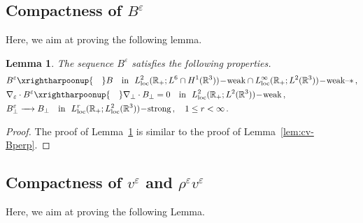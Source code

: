 \documentclass[11pt,reqno]{amsart}
\newtheorem{lemma}{Lemma}
\def \R{{\mathbb{R}}}
\begin{document}

\subsection{Compactness of $B^\varepsilon $ }
Here, we aim at proving the following lemma.
\begin{lemma}
  \label{lem:cv-Bperp-R}
  The sequence ${B^\varepsilon}$ satisfies the following properties.
  \begin{align*}
    & B^\varepsilon \xrightharpoonup{\quad} B \ \ \mbox{ \rm in } \  L_{\rm loc}^2(\R_+;L^6\cap H^1(\R^3))\!-\!\mbox{\rm weak} \cap  L_{\rm loc}^\infty(\R_+ ;L^2(\R^3))\!-\!\mbox{\rm weak--}\ast\,,\\
    & \nabla_\varepsilon \cdot B^\varepsilon   \xrightharpoonup{\quad}\nabla_\perp \cdot B_\perp =0 \ \ \mbox{ \rm in } \  L_{\rm loc}^2(\R_+; L^2(\R^3))\!-\!\mbox{\rm weak}\,,\\
    &  B_\perp^\varepsilon \xrightarrow{\quad} B_\perp \ \ \mbox{ \rm in } \  L_{\rm loc}^r(\R_+; L_{\rm loc}^2(\R^3))\!-\!\mbox{\rm strong}\,, \quad 1\leq r <\infty\,. 
  \end{align*}
\end{lemma}

\begin{proof}
The proof of Lemma~\ref{lem:cv-Bperp-R} is similar to the proof of Lemma~\ref{lem:cv-Bperp}.
\end{proof}
  

\subsection{Compactness of $v^\varepsilon $ and $\rho^\varepsilon v^\varepsilon $}
Here, we aim at proving the following Lemma.
\end{document}
